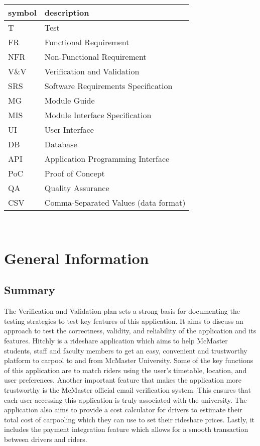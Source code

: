 \documentclass[12pt, titlepage]{article}
\begin{document}
\renewcommand{\arraystretch}{1.2}
\begin{tabular}{l l} 
  \toprule		
  \textbf{symbol} & \textbf{description}\\
  \midrule 
  T & Test\\
  FR & Functional Requirement\\
  NFR & Non-Functional Requirement\\
  V\&V & Verification and Validation\\
  SRS & Software Requirements Specification\\
  MG & Module Guide\\
  MIS & Module Interface Specification\\
  UI & User Interface\\
  DB & Database\\
  API & Application Programming Interface\\
  PoC & Proof of Concept\\
  QA & Quality Assurance\\
  CSV & Comma-Separated Values (data format)\\
  \bottomrule
\end{tabular}\\



\newpage



\section{General Information}

\subsection{Summary}

The Verification and Validation plan sets a strong basis for documenting the testing strategies 
to test key features of this application. It aims to discuss an approach to test the correctness, 
validity, and reliability of the application and its features. Hitchly is a rideshare application 
which aims to help McMaster students, staff and faculty members to get an easy, convenient and 
trustworthy platform to carpool to and from McMaster University. Some of the key functions of this 
application are to match riders using the user's timetable, location, and user preferences. Another 
important feature that makes the application more trustworthy is the McMaster official email verification 
system. This ensures that each user accessing this application is truly associated with the university. 
The application also aims to provide a cost calculator for drivers to estimate their total cost of carpooling
 which they can use to set their rideshare prices. Lastly, it includes the payment integration feature which 
 allows for a smooth transaction between drivers and riders.  
\end{document}
